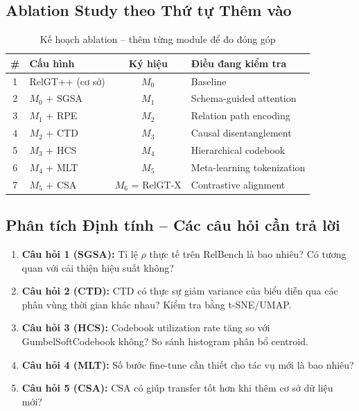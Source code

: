 \documentclass[12pt,a4paper]{article}
\begin{document}
\subsection{Ablation Study theo Thứ tự Thêm vào}

\begin{table}[H]
\centering
\caption{Kế hoạch ablation -- thêm từng module để đo đóng góp}
\begin{tabular}{clcl}
\toprule
\textbf{\#} & \textbf{Cấu hình} & \textbf{Ký hiệu} & \textbf{Điều đang kiểm tra} \\
\midrule
1 & RelGT++ (cơ sở) & $M_0$ & Baseline \\
2 & $M_0$ + SGSA & $M_1$ & Schema-guided attention \\
3 & $M_1$ + RPE & $M_2$ & Relation path encoding \\
4 & $M_2$ + CTD & $M_3$ & Causal disentanglement \\
5 & $M_3$ + HCS & $M_4$ & Hierarchical codebook \\
6 & $M_4$ + MLT & $M_5$ & Meta-learning tokenization \\
7 & $M_5$ + CSA & $M_6$ = RelGT-X & Contrastive alignment \\
\bottomrule
\end{tabular}
\end{table}

\subsection{Phân tích Định tính -- Các câu hỏi cần trả lời}

\begin{enumerate}
  \item \textbf{Câu hỏi 1 (SGSA):} Tỉ lệ $\rho$ thực tế trên RelBench là bao nhiêu?
        Có tương quan với cải thiện hiệu suất không?
  \item \textbf{Câu hỏi 2 (CTD):} CTD có thực sự giảm variance của biểu diễn
        qua các phân vùng thời gian khác nhau? Kiểm tra bằng t-SNE/UMAP.
  \item \textbf{Câu hỏi 3 (HCS):} Codebook utilization rate tăng so với
        GumbelSoftCodebook không? So sánh histogram phân bổ centroid.
  \item \textbf{Câu hỏi 4 (MLT):} Số bước fine-tune cần thiết cho tác vụ mới là bao nhiêu?
  \item \textbf{Câu hỏi 5 (CSA):} CSA có giúp transfer tốt hơn khi thêm cơ sở dữ liệu mới?
\end{enumerate}
\end{document}

